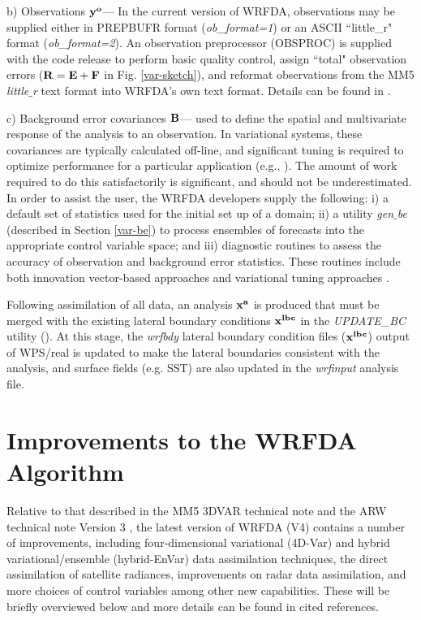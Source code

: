 b) Observations ${\bf y^{o}}$--- In the current version of WRFDA, observations may be 
supplied either in PREPBUFR format ({\it ob\_format=1}) or an ASCII ``little\_r" format
({\it ob\_format=2}). An observation preprocessor (OBSPROC) 
is supplied with the code release to perform basic quality control, assign ``total" 
observation errors (${\bf R = E+F}$ in Fig. \ref{var-sketch}), and reformat observations from the MM5 {\it little$\_$r} text 
format into WRFDA's own text format. Details can be found in \citet{barker03, barker04}.

\vspace{0.5cm}

c) Background error covariances ${\bf B}$--- used to define the spatial
and multivariate response of the analysis to an observation. In
variational systems, these covariances are typically calculated
off-line, and significant tuning is required to optimize performance
for a particular application (e.g., \citet{ingleby01, wu02}). The
amount of work required to do this satisfactorily is significant, and
should not be underestimated. In order to assist the user, the WRFDA
developers supply the following: i) a default set of statistics used
for the initial set up of a domain; ii) a utility {\it gen$\_$be}
(described in Section
\ref{var-be}) to process ensembles of forecasts into the appropriate control variable 
space; and iii) diagnostic routines to assess the accuracy of
observation and background error statistics. These routines include
both innovation vector-based approaches \citep{hollingsworth86} and
variational tuning approaches \citep{desroziers01}.

Following assimilation of all data, an analysis ${\bf x^{a}}$ is produced that must be 
merged with the existing lateral boundary conditions ${\bf x^{lbc}}$ in the {\it UPDATE\_BC} 
utility (\citet{barker03}). At this stage, the {\it wrfbdy} lateral boundary condition 
files (${\bf x^{lbc}}$) output of WPS/real is updated to make the lateral boundaries consistent 
with the analysis, and surface fields (e.g. SST) are also updated in the {\it wrfinput} analysis file.

\section{Improvements to the WRFDA Algorithm}
\label{var-upgrade}

Relative to that described in the MM5 3DVAR technical note \citep{barker03} and the ARW technical note Version 3 
\citep{skamarock08}, the latest version of WRFDA (V4) contains a number of improvements,
including four-dimensional variational (4D-Var) and hybrid variational/ensemble (hybrid-EnVar) data assimilation 
techniques, the direct assimilation of satellite radiances, improvements on radar data assimilation, and more choices
of control variables among other new capabilities. These will be briefly overviewed below and more details can be
found in cited references.

